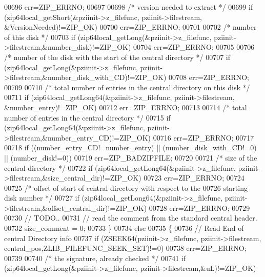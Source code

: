 \begin{DoxyCode}
00696       err=ZIP\_ERRNO;
00697 
00698     \textcolor{comment}{/* version needed to extract */}
00699     \textcolor{keywordflow}{if} (zip64local\_getShort(&pziinit->z\_filefunc, pziinit->filestream, &VersionNeeded)!=ZIP\_OK)
00700       err=ZIP\_ERRNO;
00701 
00702     \textcolor{comment}{/* number of this disk */}
00703     \textcolor{keywordflow}{if} (zip64local\_getLong(&pziinit->z\_filefunc, pziinit->filestream,&number\_disk)!=ZIP\_OK)
00704       err=ZIP\_ERRNO;
00705 
00706     \textcolor{comment}{/* number of the disk with the start of the central directory */}
00707     \textcolor{keywordflow}{if} (zip64local\_getLong(&pziinit->z\_filefunc, pziinit->filestream,&number\_disk\_with\_CD)!=ZIP\_OK)
00708       err=ZIP\_ERRNO;
00709 
00710     \textcolor{comment}{/* total number of entries in the central directory on this disk */}
00711     \textcolor{keywordflow}{if} (zip64local\_getLong64(&pziinit->z\_filefunc, pziinit->filestream, &number\_entry)!=ZIP\_OK)
00712       err=ZIP\_ERRNO;
00713 
00714     \textcolor{comment}{/* total number of entries in the central directory */}
00715     \textcolor{keywordflow}{if} (zip64local\_getLong64(&pziinit->z\_filefunc, pziinit->filestream,&number\_entry\_CD)!=ZIP\_OK)
00716       err=ZIP\_ERRNO;
00717 
00718     \textcolor{keywordflow}{if} ((number\_entry\_CD!=number\_entry) || (number\_disk\_with\_CD!=0) || (number\_disk!=0))
00719       err=ZIP\_BADZIPFILE;
00720 
00721     \textcolor{comment}{/* size of the central directory */}
00722     \textcolor{keywordflow}{if} (zip64local\_getLong64(&pziinit->z\_filefunc, pziinit->filestream,&size\_central\_dir)!=ZIP\_OK)
00723       err=ZIP\_ERRNO;
00724 
00725     \textcolor{comment}{/* offset of start of central directory with respect to the}
00726 \textcolor{comment}{    starting disk number */}
00727     \textcolor{keywordflow}{if} (zip64local\_getLong64(&pziinit->z\_filefunc, pziinit->filestream,&offset\_central\_dir)!=ZIP\_OK)
00728       err=ZIP\_ERRNO;
00729 
00730     \textcolor{comment}{// TODO..}
00731     \textcolor{comment}{// read the comment from the standard central header.}
00732     size\_comment = 0;
00733   \}
00734   \textcolor{keywordflow}{else}
00735   \{
00736     \textcolor{comment}{// Read End of central Directory info}
00737     \textcolor{keywordflow}{if} (ZSEEK64(pziinit->z\_filefunc, pziinit->filestream, central\_pos,ZLIB\_FILEFUNC\_SEEK\_SET)!=0)
00738       err=ZIP\_ERRNO;
00739 
00740     \textcolor{comment}{/* the signature, already checked */}
00741     \textcolor{keywordflow}{if} (zip64local\_getLong(&pziinit->z\_filefunc, pziinit->filestream,&uL)!=ZIP\_OK)

\end{DoxyCode}
